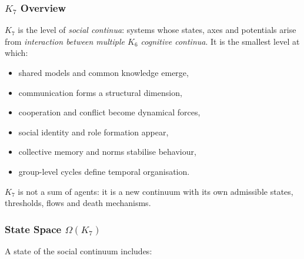 

\subsubsection{\texorpdfstring{$K_7$}{K_7} Overview}
\label{sec:k7-overview}

$K_7$ is the level of \emph{social continua}: systems whose states,
axes and potentials arise from \emph{interaction between multiple $K_6$
cognitive continua}. It is the smallest level at which:

\begin{itemize}
    \item shared models and common knowledge emerge,
    \item communication forms a structural dimension,
    \item cooperation and conflict become dynamical forces,
    \item social identity and role formation appear,
    \item collective memory and norms stabilise behaviour,
    \item group-level cycles define temporal organisation.
\end{itemize}

$K_7$ is not a sum of agents: it is a new continuum with its own
admissible states, thresholds, flows and death mechanisms.

\subsubsection{State Space \texorpdfstring{$\Omega(K_7)$}{\Omega(K_7)}}

A state of the social continuum includes:

